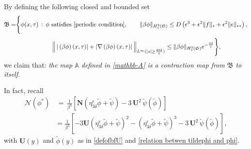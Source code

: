 \documentclass[10pt, reqno]{amsart}
\numberwithin{equation}{section}
\theoremstyle{definition}
\begin{document}
{{\medskip
By defining the following closed and bounded set
\begin{align*}
 \mathfrak B = &\Bigg\{\phi(x, \tau) \, :\, \phi~\text{satisfies}~\eqref{periodic condition},
\qquad
\|\beta\phi\|_{H^2_*(\mathfrak S)}\leq D \left( \epsilon^3+ \epsilon^2\|f\|_* + \epsilon^2\|e\|_{**}\right),
\nonumber \\[1mm]
 & \qquad \qquad \qquad
 \Big\|\, |\left(\beta \phi\right)(x, \tau) |+ | \nabla \left(\beta \phi\right)(x, \tau)|\, \Big\|_{L^\infty(|s|\geq \frac{40\delta}{\varepsilon})}
\leq
\|\beta \phi\|_{H^2_*(\mathfrak S)} e^{-\frac{2\delta} \epsilon}\Bigg\},
\end{align*}
we claim that:
{\em the map $\mathbb A $ defined in \eqref{mathbb-A} is a contraction map from $ \mathfrak B$ to itself.
}

In fact, recall
\begin{align*}
{\mathcal N}(\phi^*) & \,=\,
\frac{1}{\beta^3}
\left[\mathbf{N}( \eta_{3\delta}^{\epsilon}{\tilde\phi} +{\tilde\psi}) -3\, \mathbf{U}^2 \, {\tilde\psi}(\tilde \phi) \right]
\nonumber
 \\[2mm]
 &= \frac{1}{\beta^3}
\left[
-3\mathbf{U} \left(\eta_{3\delta}^{\epsilon}{\tilde\phi} +{\tilde\psi} \right)^2
- \left(\eta_{3\delta}^{\epsilon}{\tilde\phi} +{\tilde\psi} \right)^3
-3\, \mathbf{U}^2 \, {\tilde\psi}(\tilde \phi)
\right],
\end{align*}
with $\mathbf{U}(y)$ and $\tilde\phi(y)$ as in \eqref{defofbfU} and \eqref{relation betwen tildephi and phi}.

}}
\end{document}
